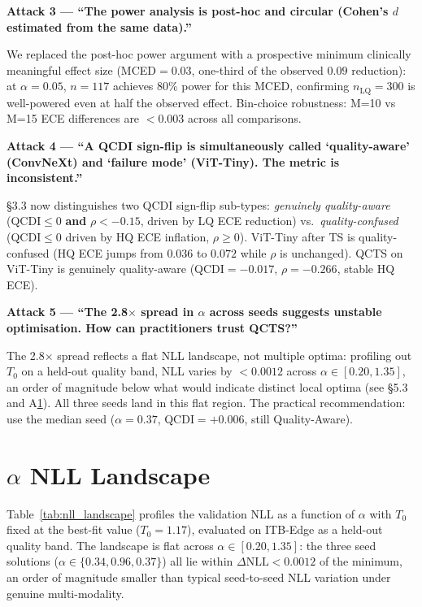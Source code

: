 \documentclass{bmvc2k}
\begin{document}
\textbf{Attack 3 — ``The power analysis is post-hoc and circular (Cohen's $d$ estimated from the same data).''}

We replaced the post-hoc power argument with a prospective minimum clinically meaningful effect size (MCED${=}0.03$, one-third of the observed $0.09$ reduction): at $\alpha{=}0.05$, $n{=}117$ achieves 80\% power for this MCED, confirming $n_\text{LQ}{=}300$ is well-powered even at half the observed effect. Bin-choice robustness: M=10 vs M=15 ECE differences are ${<}0.003$ across all comparisons.

\textbf{Attack 4 — ``A QCDI sign-flip is simultaneously called `quality-aware' (ConvNeXt) and `failure mode' (ViT-Tiny). The metric is inconsistent.''}

\S3.3 now distinguishes two QCDI sign-flip sub-types: \emph{genuinely quality-aware} (QCDI${\le}0$ \textbf{and} $\rho{<}{-}0.15$, driven by LQ ECE reduction) vs.\ \emph{quality-confused} (QCDI${\le}0$ driven by HQ ECE inflation, $\rho{\ge}0$). ViT-Tiny after TS is quality-confused (HQ ECE jumps from $0.036$ to $0.072$ while $\rho$ is unchanged). QCTS on ViT-Tiny is genuinely quality-aware (QCDI${=}{-}0.017$, $\rho{=}{-}0.266$, stable HQ ECE).

\textbf{Attack 5 — ``The 2.8$\times$ spread in $\alpha$ across seeds suggests unstable optimisation. How can practitioners trust QCTS?''}

The 2.8$\times$ spread reflects a flat NLL landscape, not multiple optima: profiling out $T_0$ on a held-out quality band, NLL varies by ${<}0.0012$ across $\alpha\in[0.20, 1.35]$, an order of magnitude below what would indicate distinct local optima (see \S5.3 and A\ref{app:nll_landscape}). All three seeds land in this flat region. The practical recommendation: use the median seed ($\alpha{=}0.37$, QCDI${=}{+}0.006$, still Quality-Aware).

\section{$\alpha$ NLL Landscape}
\label{app:nll_landscape}

Table~\ref{tab:nll_landscape} profiles the validation NLL as a function of $\alpha$ with $T_0$ fixed at the best-fit value ($T_0{=}1.17$), evaluated on ITB-Edge as a held-out quality band. The landscape is flat across $\alpha\in[0.20, 1.35]$: the three seed solutions ($\alpha\in\{0.34, 0.96, 0.37\}$) all lie within $\Delta\text{NLL}{<}0.0012$ of the minimum, an order of magnitude smaller than typical seed-to-seed NLL variation under genuine multi-modality.
\end{document}
